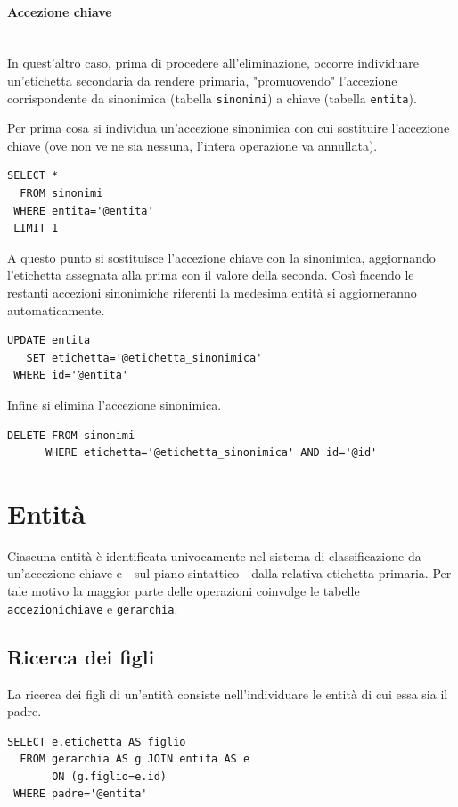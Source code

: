 \documentclass[10pt,a4paper,headinclude,footinclude,hidelinks]{scrreprt} %
\begin{document}
	\paragraph{Accezione chiave} \hfill \\
	In quest'altro caso, prima di procedere all'eliminazione, occorre individuare un'etichetta secondaria da rendere primaria, "promuovendo" l'accezione corrispondente da sinonimica (tabella \texttt{sinonimi}) a chiave (tabella \texttt{entita}).

	Per prima cosa si individua un'accezione sinonimica con cui sostituire l'accezione chiave (ove non ve ne sia nessuna, l'intera operazione va annullata).
\begin{verbatim}
SELECT *
  FROM sinonimi
 WHERE entita='@entita'
 LIMIT 1
\end{verbatim}

	A questo punto si sostituisce l'accezione chiave con la sinonimica, aggiornando l'etichetta assegnata alla prima con il valore della seconda. Così facendo le restanti accezioni sinonimiche riferenti la medesima entità si aggiorneranno automaticamente.
\begin{verbatim}
UPDATE entita
   SET etichetta='@etichetta_sinonimica'
 WHERE id='@entita'
\end{verbatim} 

	Infine si elimina l'accezione sinonimica.
\begin{verbatim}
DELETE FROM sinonimi
      WHERE etichetta='@etichetta_sinonimica' AND id='@id'
\end{verbatim}

	\section{Entit\`a}
	Ciascuna entità è identificata univocamente nel sistema di classificazione da un'accezione chiave e - sul piano sintattico - dalla relativa etichetta primaria. Per tale motivo la maggior parte delle operazioni coinvolge le tabelle \texttt{accezioni\textunderscore chiave} e \texttt{gerarchia}.
 
	\subsection{Ricerca dei figli}
	La ricerca dei figli di un'entità consiste nell'individuare le entità di cui essa sia il padre.
\begin{verbatim}
SELECT e.etichetta AS figlio
  FROM gerarchia AS g JOIN entita AS e
       ON (g.figlio=e.id)
 WHERE padre='@entita'
\end{verbatim}
\end{document}
